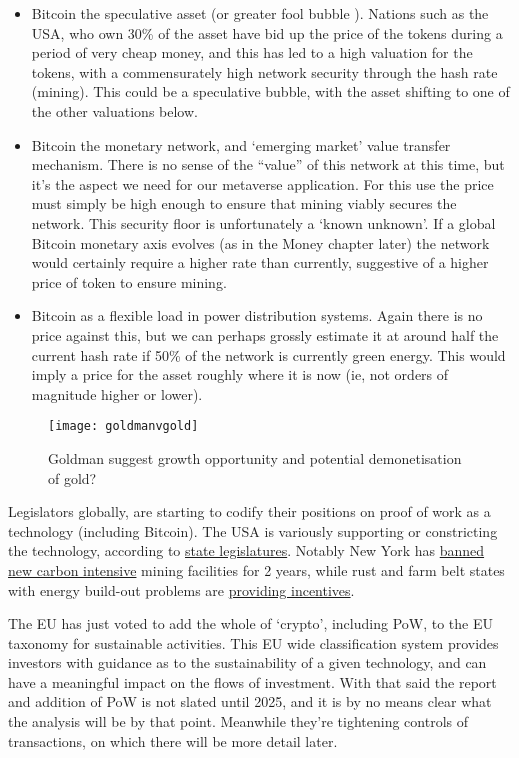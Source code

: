 \begin{itemize}
\item Bitcoin the speculative asset (or greater fool bubble \cite{de1990positive}). Nations such as the USA, who own 30\% of the asset have bid up the price of the tokens during a period of very cheap money, and this has led to a high valuation for the tokens, with a commensurately high network security through the hash rate (mining). This could be a speculative bubble, with the asset shifting to one of the other valuations below.
\item Bitcoin the monetary network, and `emerging market' value transfer mechanism. There is no sense of the ``value'' of this network at this time, but it's the aspect we need for our metaverse application. For this use the price must simply be high enough to ensure that mining viably secures the network. This security floor is unfortunately a `known unknown'. If a global Bitcoin monetary axis evolves (as in the Money chapter later) the network would certainly require a higher rate than currently, suggestive of a higher price of token to ensure mining.
\item Bitcoin as a flexible load in power distribution systems. Again there is no price against this, but we can perhaps grossly estimate it at around half the current hash rate if 50\% of the network is currently green energy. This would imply a price for the asset roughly where it is now (ie, not orders of magnitude higher or lower).  
\end{itemize}
\begin{figure}
  \centering
    \texttt{[image: goldmanvgold]}
  \caption{Goldman suggest growth opportunity and potential demonetisation of gold?}
  \label{fig:goldmanVgold}
\end{figure}
Legislators globally, are starting to codify their positions on proof of work as a technology (including Bitcoin). The USA is variously supporting or constricting the technology, according to \href{https://www.ncsl.org/research/financial-services-and-commerce/cryptocurrency-2021-legislation.aspx}{state legislatures}. Notably New York has \href{https://www.nysenate.gov/legislation/bills/2021/A7389}{banned new carbon intensive} mining facilities for 2 years, while rust and farm belt states with energy build-out problems are \href{https://financialpost.com/fp-finance/cryptocurrency/texas-governor-abbott-turns-to-bitcoin-miners-to-bolster-the-grid-and-his-re-election}{providing incentives}. \par
The EU has just voted to add the whole of `crypto', including PoW, to the EU taxonomy for sustainable activities. This EU wide classification system provides investors with guidance as to the sustainability of a given technology, and can have a meaningful impact on the flows of investment. With that said the report and addition of PoW is not slated until 2025, and it is by no means clear what the analysis will be by that point. Meanwhile they're tightening controls of transactions, on which there will be more detail later.  \par
